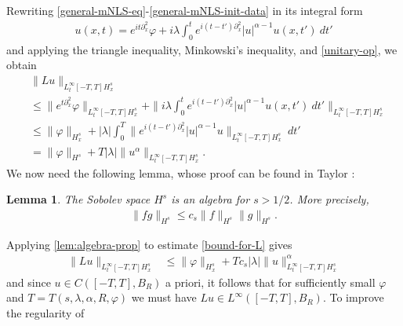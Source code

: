 \documentclass[12pt,reqno]{amsart}
\newcommand{\p}{\partial}
\newcommand{\vp}{\varphi}
\theoremstyle{plain}  %
\newtheorem{lemma}{Lemma}
\begin{document}
\begin{appendices}
Rewriting \eqref{general-mNLS-eq}-\eqref{general-mNLS-init-data} in its 
integral form
%
%
\begin{equation}
	\label{mNLS-int-form-with-op}
	\begin{split}
		u(x,t) = e^{it \p_x^2} \vp + i \lambda \int_0^t e^{i(t - 
		t')\p_x^2} |u|^{\alpha -1} u(x, t') \ dt' 
	\end{split}
\end{equation}
%
%
and applying the triangle inequality, Minkowski's inequality, and 
\eqref{unitary-op}, we obtain
%
%
\begin{equation}
	\label{bound-for-L}
	\begin{split}
		& \|Lu\|_{L^\infty_t[-T, T] H^s_x}
		\\
		& \le \|e^{t \p_x^2}
		\vp\|_{L^\infty_t[-T, T] H^s_x} + \|i \lambda \int_0^t e^{i(t - 
		t')\p_x^2} |u|^{\alpha -1} u(x, t') \ dt' \|_{L^\infty_t[-T, T] 
		H^s_x} 
		\\
		& \le \|\vp\|_{H^s_x} + |\lambda| \int_0^T \|e^{i(t 
		-t')\p_x^2} |u|^{\alpha -1} u \|_{L^\infty_t[-T, T] H^s_x} \ 
		dt'
		\\
		& = \|\vp\|_{H^s} + T |\lambda| \|u^\alpha \|_{L^\infty_t[-T, T] H^s_x}.
	\end{split}
\end{equation}
%
%
We now need the following lemma, whose proof can be found in Taylor 
\cite{Taylor_1991_Pseudodifferent}:
%
%
%
\begin{lemma}
	\label{lem:algebra-prop}
	The Sobolev space $H^s$ is an algebra for $s>1/2$. More precisely, 
%
%
\begin{equation}
	\label{algebra-prop}
	\begin{split}
		\|fg\|_{H^s} \le c_s \|f\|_{H^s} \|g\|_{H^s}.
	\end{split}
\end{equation}
%
%
%
\end{lemma}
%
%
Applying \autoref{lem:algebra-prop} to estimate \eqref{bound-for-L} gives
%
%
%
%
\begin{equation}
	\label{Tu-space-bound}
	\begin{split}
		\|Lu\|_{L^\infty_t[-T, T] H^s_x}
		& \le \|\vp\|_{H^s_x} + Tc_s | \lambda| \|u\|_{L^\infty_t[-T, T] 
		H^s_x}^\alpha
	\end{split}
\end{equation}
%
%
and since $u \in C([-T, T], B_R)$ a priori, it follows
that for sufficiently small $\vp$ and $T = T(s, \lambda, \alpha, R, \vp)$ we must 
have $Lu \in L^\infty([-T, T], B_R)$. To improve the regularity of 

\end{appendices}
\end{document}
